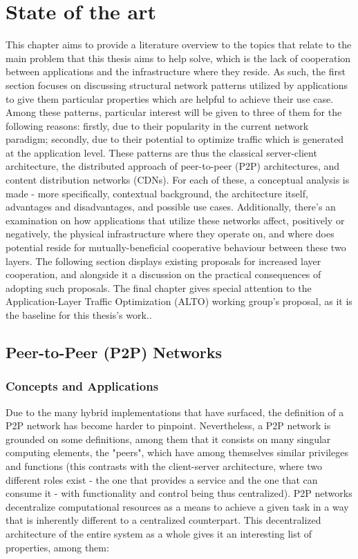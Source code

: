 \chapter{State of the art}

    This chapter aims to provide a literature overview to the topics that relate to the main problem that this thesis aims to help solve, which is the lack of cooperation between applications and the infrastructure where they reside.
    As such, the first section focuses on discussing structural network patterns utilized by applications to give them particular properties which are helpful to achieve their use case.
    Among these patterns, particular interest will be given to three of them for the following reasons: firstly, due to their popularity in the current network paradigm; secondly, due to their potential to optimize traffic which is generated at the application level.
    These patterns are thus the classical server-client architecture, the distributed approach of peer-to-peer (P2P) architectures, and content distribution networks (CDNs).
    For each of these, a conceptual analysis is made - more specifically, contextual background, the architecture itself, advantages and disadvantages, and possible use cases.
    Additionally, there's an examination on how applications that utilize these networks affect, positively or negatively, the physical infrastructure where they operate on, and where does potential reside for mutually-beneficial cooperative behaviour between these two layers.
    The following section displays existing proposals for increased layer cooperation, and alongside it a discussion on the practical consequences of adopting such proposals.
    The final chapter gives special attention to the Application-Layer Traffic Optimization (ALTO) working group's proposal, as it is the baseline for this thesis's work..

\section{Peer-to-Peer (P2P) Networks}

\subsection{Concepts and Applications}

    Due to the many hybrid implementations that have surfaced, the definition of a P2P network has become harder to pinpoint.
    Nevertheless, a P2P network is grounded on some definitions, among them that it consists on many singular computing elements, the "peers", which have among themselves similar privileges and functions (this contrasts with the client-server architecture, where two different roles exist - the one that provides a service and the one that can consume it - with functionality and control being thus centralized).
    P2P networks decentralize computational resources as a means to achieve a given task in a way that is inherently different to a centralized counterpart.
    This decentralized architecture of the entire system as a whole gives it an interesting list of properties, among them:

